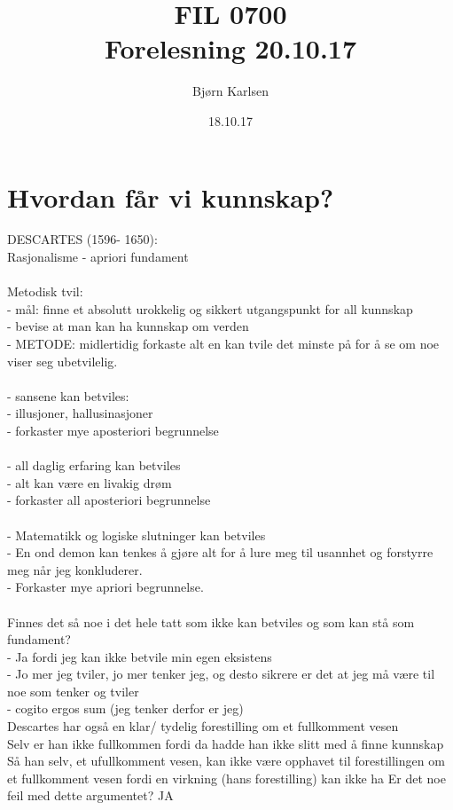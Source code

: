 \documentclass[11pt]{article}
\title{\textbf{FIL 0700\linebreak[2.0]\\Forelesning 20.10.17}}
\author{Bjørn Karlsen}
\date{18.10.17}
\begin{document}
\maketitle

\section{Hvordan får vi kunnskap?}
DESCARTES (1596- 1650):\\
Rasjonalisme - apriori fundament\\\\
Metodisk tvil:\\
- mål: finne et absolutt urokkelig og sikkert utgangspunkt for all kunnskap\\
- bevise at man kan ha kunnskap om verden\\
- METODE: midlertidig forkaste alt en kan tvile det minste på for å se om noe viser seg ubetvilelig.\\\\
- sansene kan betviles:\\
- illusjoner, hallusinasjoner\\
- forkaster mye aposteriori begrunnelse\\\\
- all daglig erfaring kan betviles\\
- alt kan være en livakig drøm\\
- forkaster all aposteriori begrunnelse\\\\
- Matematikk og logiske slutninger kan betviles\\
- En ond demon kan tenkes å gjøre alt for å lure meg til usannhet og forstyrre meg når jeg konkluderer.\\
- Forkaster mye apriori begrunnelse.\\\\
Finnes det så noe i det hele tatt som ikke kan betviles og som kan stå som fundament?\\
- Ja fordi jeg kan ikke betvile min egen eksistens\\
- Jo mer jeg tviler, jo mer tenker jeg, og desto sikrere er det at jeg må være til noe som tenker og tviler\\
- cogito ergos sum (jeg tenker derfor er jeg)\\

Descartes har også en klar/ tydelig forestilling om et fullkomment vesen\\
Selv er han ikke fullkommen fordi da hadde han ikke slitt med å finne kunnskap\\
Så han selv, et ufullkomment vesen, kan ikke være opphavet til forestillingen om et fullkomment vesen fordi en virkning (hans forestilling) kan ikke ha
Er det noe feil med dette argumentet? JA
\end{document}
